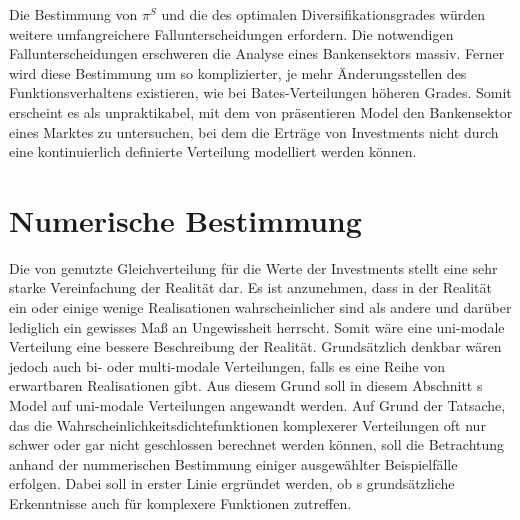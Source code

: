 Die Bestimmung von $\pi^S$ und die des optimalen Diversifikationsgrades würden weitere umfangreichere Fallunterscheidungen erfordern. Die notwendigen Fallunterscheidungen erschweren die Analyse eines Bankensektors massiv. Ferner wird diese Bestimmung um so komplizierter, je mehr Änderungsstellen des Funktionsverhaltens existieren, wie \zb{} bei Bates-Verteilungen höheren Grades. Somit erscheint es als unpraktikabel, mit dem von \citeauthor{Wagner-2010} präsentieren Model den Bankensektor eines Marktes zu untersuchen, bei dem die Erträge von Investments nicht durch eine kontinuierlich definierte Verteilung modelliert werden können.

\section{Numerische Bestimmung}%
\label{sec:other:numeric}

Die von \citeauthor{Wagner-2010} genutzte Gleichverteilung für die Werte der Investments stellt eine sehr starke Vereinfachung der Realität dar. Es ist anzunehmen, dass in der Realität ein oder einige wenige Realisationen wahrscheinlicher sind als andere und darüber lediglich ein gewisses Maß an Ungewissheit herrscht. Somit wäre eine uni-modale Verteilung eine bessere Beschreibung der Realität. Grundsätzlich denkbar wären jedoch auch bi- oder multi-modale Verteilungen, falls es \zb{} eine Reihe von erwartbaren Realisationen gibt. Aus diesem Grund soll in diesem Abschnitt \citeauthor{Wagner-2010}s Model auf uni-modale Verteilungen angewandt werden. Auf Grund der Tatsache, das die Wahrscheinlichkeitsdichtefunktionen komplexerer Verteilungen oft nur schwer oder gar nicht geschlossen berechnet werden können, soll die Betrachtung anhand der nummerischen Bestimmung einiger ausgewählter Beispielfälle erfolgen. Dabei soll in erster Linie ergründet werden, ob \citeauthor{Wagner-2010}s grundsätzliche Erkenntnisse auch für komplexere Funktionen zutreffen.

